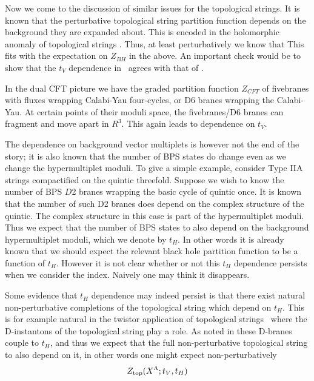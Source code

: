  Now we come to the discussion of
similar issues for the topological strings.  It is known that the
perturbative topological string partition function depends on the
background they are expanded about.  This is encoded in the
holomorphic anomaly of topological strings .
Thus, at least perturbatively we know that
%
\eqn{}
%
This fits with the expectation on $Z_{BH}$ in the above.
An important check would be to show that the $t_V$ dependence
in \rzb\ agrees with that of \rzbb .

 In the dual CFT picture we have the
graded partition function $Z_{CFT}$ of fivebranes with fluxes
wrapping Calabi-Yau four-cycles, or D6 branes wrapping the Calabi-Yau.
At certain points of their moduli space, the fivebranes/D6 branes can
fragment and move apart in $R^3$.  This again leads to dependence
on $t_V$.


 The dependence on background vector multiplets is however not the end of the story; it is
also known that the number of BPS states do change even as we
change the hypermultiplet moduli. To give a simple example,
consider Type IIA strings compactified on the quintic threefold.
Suppose we wish to know the number of BPS $D$2 branes wrapping the
basic cycle of quintic once. It is known that the number of such
D2 branes does depend on the complex structure of the quintic. The
complex structure in this case is part of the hypermultiplet
moduli.  Thus we expect that the number of BPS states to also
depend on the background hypermultiplet moduli, which we denote by
$t_H$.  In other words it is already known that we should expect
the relevant black hole partition function to be a function of
$t_H$. However it is not clear whether or not this $t_H$
dependence persists when we consider the index.  Naively
one may think it disappears.


Some evidence that $t_H$ dependence may indeed persist is that
there exist natural non-perturbative completions of the
topological string which depend on $t_H$.  This is for example
natural in the twistor application of topological strings \wittwi\
where the D-instantons of the topological string play a role.  As
noted in \refs{\nv ,\nov} these D-branes couple to $t_H$, and thus
we expect that the full non-perturbative topological string to
also depend on it, in other words one might expect
non-perturbatively
%
$$Z_{\rm top}(X^\Lambda; t_V,t_H)$$
%


